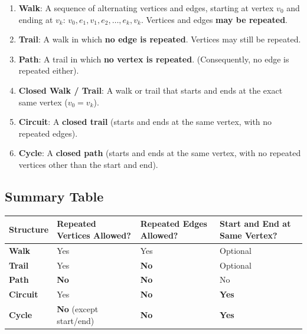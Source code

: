 \documentclass[
]{book}
\newcounter{none} %
\providecommand{\tightlist}{%
  \setlength{\itemsep}{0pt}\setlength{\parskip}{0pt}}
\theoremstyle{definition}
\theoremstyle{definition}
\theoremstyle{definition}
\theoremstyle{definition}
\theoremstyle{remark}
\begin{document}
\begin{enumerate}
\def\labelenumi{\arabic{enumi}.}
\tightlist
\item
  \textbf{Walk}: A sequence of alternating vertices and edges, starting at vertex \(v_0\) and ending at \(v_k\): \(v_0, e_1, v_1, e_2, \dots, e_k, v_k\). Vertices and edges \textbf{may be repeated}.
\item
  \textbf{Trail}: A walk in which \textbf{no edge is repeated}. Vertices may still be repeated.
\item
  \textbf{Path}: A trail in which \textbf{no vertex is repeated}. (Consequently, no edge is repeated either).
\item
  \textbf{Closed Walk / Trail}: A walk or trail that starts and ends at the exact same vertex (\(v_0 = v_k\)).
\item
  \textbf{Circuit}: A \textbf{closed trail} (starts and ends at the same vertex, with no repeated edges).
\item
  \textbf{Cycle}: A \textbf{closed path} (starts and ends at the same vertex, with no repeated vertices other than the start and end).
\end{enumerate}

\subsection{Summary Table}\label{summary-table}

{\def\LTcaptype{none} %
\begin{longtable}[]{@{}
  >{\raggedright\arraybackslash}p{}
  >{\raggedright\arraybackslash}p{}
  >{\raggedright\arraybackslash}p{}
  >{\raggedright\arraybackslash}p{}@{}}
\toprule\noalign{}
\begin{minipage}[b]{\linewidth}\raggedright
Structure
\end{minipage} & \begin{minipage}[b]{\linewidth}\raggedright
Repeated Vertices Allowed?
\end{minipage} & \begin{minipage}[b]{\linewidth}\raggedright
Repeated Edges Allowed?
\end{minipage} & \begin{minipage}[b]{\linewidth}\raggedright
Start and End at Same Vertex?
\end{minipage} \\
\midrule\noalign{}
\endhead
\bottomrule\noalign{}
\endlastfoot
\textbf{Walk} & Yes & Yes & Optional \\
\textbf{Trail} & Yes & \textbf{No} & Optional \\
\textbf{Path} & \textbf{No} & \textbf{No} & No \\
\textbf{Circuit} & Yes & \textbf{No} & \textbf{Yes} \\
\textbf{Cycle} & \textbf{No} (except start/end) & \textbf{No} & \textbf{Yes} \\
\end{longtable}
}
\end{document}
